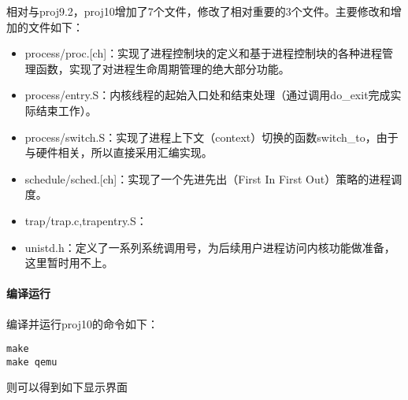 相对与proj9.2，proj10增加了7个文件，修改了相对重要的3个文件。主要修改和增加的文件如下：

\begin{itemize}
\tightlist
\item
  process/proc.{[}ch{]}：实现了进程控制块的定义和基于进程控制块的各种进程管理函数，实现了对进程生命周期管理的绝大部分功能。
\item
  process/entry.S：内核线程的起始入口处和结束处理（通过调用do\_exit完成实际结束工作）。
\item
  process/switch.S：实现了进程上下文（context）切换的函数switch\_to，由于与硬件相关，所以直接采用汇编实现。
\item
  schedule/sched.{[}ch{]}：实现了一个先进先出（First In First
  Out）策略的进程调度。
\item
  trap/trap.c,trapentry.S：
\item
  unistd.h：定义了一系列系统调用号，为后续用户进程访问内核功能做准备，这里暂时用不上。
\end{itemize}

\paragraph{编译运行}\label{ux7f16ux8bd1ux8fd0ux884c}

编译并运行proj10的命令如下：

\begin{lstlisting}
make
make qemu
\end{lstlisting}

则可以得到如下显示界面

